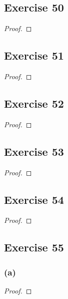 \documentclass[14pt]{extarticle}
\begin{document}
\subsection{Exercise 50}

\begin{proof}

\end{proof}

\subsection{Exercise 51}

\begin{proof}

\end{proof}

\subsection{Exercise 52}

\begin{proof}

\end{proof}

\subsection{Exercise 53}

\begin{proof}

\end{proof}

\subsection{Exercise 54}

\begin{proof}

\end{proof}

\subsection{Exercise 55}

\subsubsection{(a)}

\begin{proof}

\end{proof}
\end{document}

